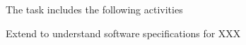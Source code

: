 \begin{task}[
  title=Support more software specification standards,
  id=patterns,
  lead=SRL,
  PM=1,
  wphases={0-36},
  partners={??}
  ]
  The task includes the following activities
  \begin{compactitem}
  \item Extend \repotodocker{} to understand software specifications for XXX
  \end{compactitem}
\end{task}
